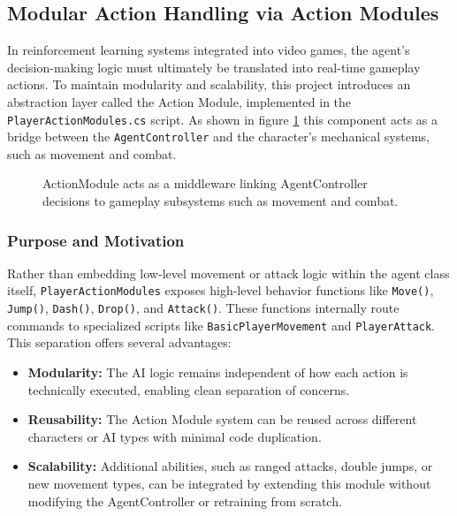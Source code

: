 \documentclass[12pt,oneside,openright,a4paper]{cpe-english-project}
\begin{document}
\subsection{Modular Action Handling via Action Modules}
In reinforcement learning systems integrated into video games, the agent's decision-making logic must ultimately be translated into real-time gameplay actions. To maintain modularity and scalability, this project introduces an abstraction layer called the Action Module, implemented in the \texttt{PlayerActionModules.cs} script. As shown in figure \ref{fig:ActionModuleDia} this component acts as a bridge between the \texttt{AgentController} and the character's mechanical systems, such as movement and combat.

\begin{figure}[H]
\centering
{}
\caption{ActionModule acts as a middleware linking AgentController decisions to gameplay subsystems such as movement and combat.}
\label{fig:ActionModuleDia}
\end{figure}

\subsubsection{Purpose and Motivation}
Rather than embedding low-level movement or attack logic within the agent class itself, \texttt{PlayerActionModules} exposes high-level behavior functions like \texttt{Move()}, \texttt{Jump()}, \texttt{Dash()}, \texttt{Drop()}, and \texttt{Attack()}. These functions internally route commands to specialized scripts like \texttt{BasicPlayerMovement} and \texttt{PlayerAttack}.
This separation offers several advantages:

\begin{itemize}
\item \textbf{Modularity:} The AI logic remains independent of how each action is technically executed, enabling clean separation of concerns.
\item \textbf{Reusability:} The Action Module system can be reused across different characters or AI types with minimal code duplication.
\item \textbf{Scalability:} Additional abilities, such as ranged attacks, double jumps, or new movement types, can be integrated by extending this module without modifying the AgentController or retraining from scratch.
\end{itemize}
\end{document}
